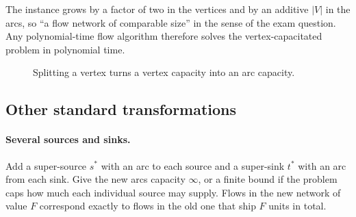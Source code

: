 The instance grows by a factor of two in the vertices and by an additive $|V|$
in the arcs, so ``a flow network of comparable size'' in the sense of the exam
question. Any polynomial-time flow algorithm therefore solves the
vertex-capacitated problem in polynomial time.

\begin{figure}[ht]
\centering
{}
\caption{Splitting a vertex turns a vertex capacity into an arc capacity.}
\label{fig:flow-vertex-split}
\end{figure}

\subsection{Other standard transformations}
\label{sec:flow-transformations}

\paragraph{Several sources and sinks.}
Add a super-source $s^\ast$ with an arc to each source and a super-sink
$t^\ast$ with an arc from each sink. Give the new arcs capacity $\infty$, or a
finite bound if the problem caps how much each individual source may supply.
Flows in the new network of value $F$ correspond exactly to flows in the old
one that ship $F$ units in total.

